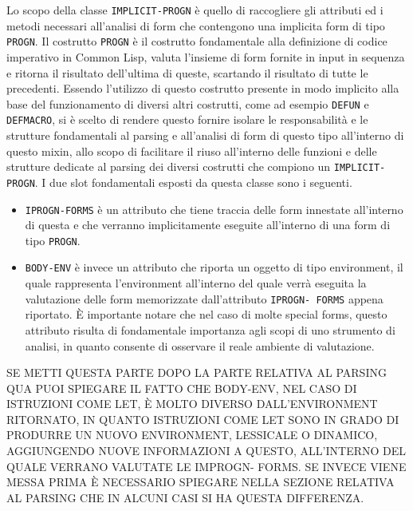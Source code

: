 Lo scopo della classe \texttt{IMPLICIT-PROGN} è quello di raccogliere gli
attributi ed i metodi necessari all’analisi di form che contengono una
implicita form di tipo \texttt{PROGN}. Il costrutto \texttt{PROGN} è il
costrutto fondamentale alla definizione di codice imperativo in Common Lisp,
valuta l’insieme di form fornite in input in sequenza e ritorna il risultato
dell’ultima di queste, scartando il risultato di tutte le precedenti. Essendo
l’utilizzo di questo costrutto presente in modo implicito alla base del
funzionamento di diversi altri costrutti, come ad esempio \texttt{DEFUN} e
\texttt{DEFMACRO}, si è scelto di rendere questo fornire isolare le
responsabilità e le strutture fondamentali al parsing e all’analisi di form di
questo tipo all’interno di questo mixin, allo scopo di facilitare il riuso
all’interno delle funzioni e delle strutture dedicate al parsing dei diversi
costrutti che compiono un \texttt{IMPLICIT-PROGN}. I due slot fondamentali
esposti da questa classe sono i seguenti.\\

\begin{itemize}

\item \texttt{IPROGN-FORMS} è un attributo che tiene traccia delle form
innestate all’interno di questa e che verranno implicitamente eseguite
all’interno di una form di tipo \texttt{PROGN}.

\item \texttt{BODY-ENV} è invece un attributo che riporta un oggetto di tipo
environment, il quale rappresenta l’environment all’interno del quale verrà
eseguita la valutazione delle form memorizzate dall’attributo \texttt{IPROGN-
FORMS} appena riportato. È importante notare che nel caso di molte special
forms, questo attributo risulta di fondamentale importanza agli scopi di uno
strumento di analisi, in quanto consente di osservare il reale ambiente di
valutazione.

\end{itemize}

SE METTI QUESTA PARTE DOPO LA PARTE RELATIVA AL PARSING QUA PUOI SPIEGARE IL
FATTO CHE BODY-ENV, NEL CASO DI ISTRUZIONI COME LET, È MOLTO DIVERSO
DALL’ENVIRONMENT RITORNATO, IN QUANTO ISTRUZIONI COME LET SONO IN GRADO DI
PRODURRE UN NUOVO ENVIRONMENT, LESSICALE O DINAMICO, AGGIUNGENDO NUOVE
INFORMAZIONI A QUESTO, ALL’INTERNO DEL QUALE VERRANO VALUTATE LE IMPROGN-
FORMS. SE INVECE VIENE MESSA PRIMA È NECESSARIO SPIEGARE NELLA SEZIONE
RELATIVA AL PARSING CHE IN ALCUNI CASI SI HA QUESTA DIFFERENZA.\\

